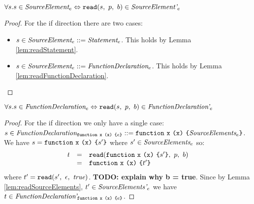 \documentclass[preprint,10pt]{sigplanconf}
\begin{document}
\begin{lemma}\mbox{}
  
  \( \forall s. s \in \textit{SourceElement}_{e} \Leftrightarrow 
  \texttt{read}(s,~p,~b) \in \textit{SourceElement'}_{e} \)
\end{lemma}
\begin{proof}
  For the if direction there are two cases:
  \begin{itemize}
  \item \( s \in \textit{SourceElement}_{e} ::= \textit{Statement}_{e} \).
    This holds by Lemma \ref{lem:readStatement}.
    
  \item \( s \in \textit{SourceElement}_{e} ::=
    \textit{FunctionDeclaration}_{e} \). This holds by Lemma
    \ref{lem:readFunctionDeclaration}.
  \end{itemize}
\end{proof}

\begin{lemma}\mbox{}
  
  \( \forall s. s \in \textit{FunctionDeclaration}_{e} \Leftrightarrow 
  \texttt{read}(s,~p,~b) \in \textit{FunctionDeclaration'}_{e} \)
\end{lemma}
\begin{proof}
  For the if direction we only have a single case: \( s \in
  \textit{FunctionDeclaration}_{\texttt{function}~\texttt{x}~\texttt{(}\texttt{x}\texttt{)}~\texttt{\{}e\texttt{\}}}
  ::= \texttt{function}~\texttt{x}~\texttt{(}\texttt{x}\texttt{)}~\texttt{\{}\textit{SourceElements}_{e}\texttt{\}}
 \). We have \( s = \texttt{function}~\texttt{x}~\texttt{(}\texttt{x}\texttt{)}~\texttt{\{}s'\texttt{\}}
 \) where \( s' \in \textit{SourceElements}_{e} \) so:
 \[
 \begin{array}{rcl}
   t &=& \texttt{read}(\texttt{function}~\texttt{x}~\texttt{(}\texttt{x}\texttt{)}~\texttt{\{}s'\texttt{\}},~p,~b)
   \\
   &=& \texttt{function}~\texttt{x}~\texttt{(}\texttt{x}\texttt{)}~\texttt{\{}t'\texttt{\}}
 \end{array}
 \]
 where \( t' = \texttt{read}(s',~\epsilon,~\textit{true}) \). \textbf{TODO:
   explain why b = true}. Since by Lemma \ref{lem:readSourceElements},
 \( t' \in \textit{SourceElements'}_{e} \) we have \( t \in \textit{FunctionDeclaration'}_{\texttt{function}~\texttt{x}~\texttt{(}\texttt{x}\texttt{)}~\texttt{\{}e\texttt{\}}} \).
\end{proof}
\end{document}
